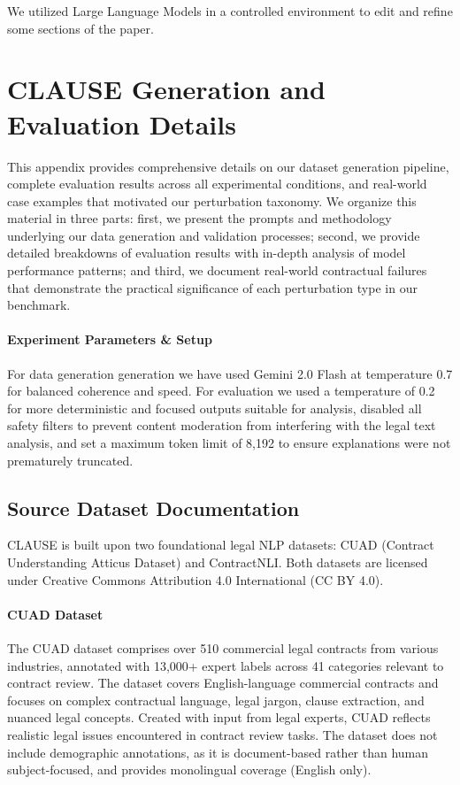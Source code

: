 \documentclass[11pt]{article}
\newcommand{\datasetName}{{\sc CLAUSE}\xspace}
\begin{document}
We utilized Large Language Models in a controlled environment to edit and refine some sections of the paper.




\appendix

\section{\datasetName Generation and Evaluation Details}
\label{sec:appendix-details}

This appendix provides comprehensive details on our dataset generation pipeline, complete evaluation results across all experimental conditions, and real-world case examples that motivated our perturbation taxonomy. We organize this material in three parts: first, we present the prompts and methodology underlying our data generation and validation processes; second, we provide detailed breakdowns of evaluation results with in-depth analysis of model performance patterns; and third, we document real-world contractual failures that demonstrate the practical significance of each perturbation type in our benchmark.

\paragraph{Experiment Parameters \& Setup}For data generation generation we have used Gemini 2.0 Flash at temperature 0.7 for balanced coherence and speed. For evaluation we used a temperature of 0.2 for more deterministic and focused outputs suitable for analysis, disabled all safety filters to prevent content moderation from interfering with the legal text analysis, and set a maximum token limit of 8,192 to ensure explanations were not prematurely truncated.

\subsection{Source Dataset Documentation}
\label{sec:source-dataset-documentation}

\datasetName is built upon two foundational legal NLP datasets: CUAD (Contract Understanding Atticus Dataset) and ContractNLI. Both datasets are licensed under Creative Commons Attribution 4.0 International (CC BY 4.0).

\paragraph{CUAD Dataset} The CUAD dataset comprises over 510 commercial legal contracts from various industries, annotated with 13,000+ expert labels across 41 categories relevant to contract review. The dataset covers English-language commercial contracts and focuses on complex contractual language, legal jargon, clause extraction, and nuanced legal concepts. Created with input from legal experts, CUAD reflects realistic legal issues encountered in contract review tasks. The dataset does not include demographic annotations, as it is document-based rather than human subject-focused, and provides monolingual coverage (English only).
\end{document}

